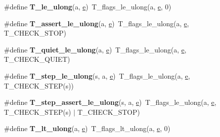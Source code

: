 \begin{DoxyCompactItemize}
\#define {\bfseries T\+\_\+le\+\_\+ulong}(a,  \mbox{\hyperlink{sun4u_2tte_8h_a8b0b9ed08e0e18920ec2682f48228c27}{e}})~T\+\_\+flags\+\_\+le\+\_\+ulong(a, \mbox{\hyperlink{sun4u_2tte_8h_a8b0b9ed08e0e18920ec2682f48228c27}{e}}, 0)
\item 
\mbox{\label{group__RTEMSTestFrameworkChecksULong_gac7131fa241a22a56e1d02a7219a679b1}} 
\#define {\bfseries T\+\_\+assert\+\_\+le\+\_\+ulong}(a,  \mbox{\hyperlink{sun4u_2tte_8h_a8b0b9ed08e0e18920ec2682f48228c27}{e}})~T\+\_\+flags\+\_\+le\+\_\+ulong(a, \mbox{\hyperlink{sun4u_2tte_8h_a8b0b9ed08e0e18920ec2682f48228c27}{e}}, T\+\_\+\+C\+H\+E\+C\+K\+\_\+\+S\+T\+OP)
\item 
\mbox{\label{group__RTEMSTestFrameworkChecksULong_gaafa15063182050760310b0ffdb9fe550}} 
\#define {\bfseries T\+\_\+quiet\+\_\+le\+\_\+ulong}(a,  \mbox{\hyperlink{sun4u_2tte_8h_a8b0b9ed08e0e18920ec2682f48228c27}{e}})~T\+\_\+flags\+\_\+le\+\_\+ulong(a, \mbox{\hyperlink{sun4u_2tte_8h_a8b0b9ed08e0e18920ec2682f48228c27}{e}}, T\+\_\+\+C\+H\+E\+C\+K\+\_\+\+Q\+U\+I\+ET)
\item 
\mbox{\label{group__RTEMSTestFrameworkChecksULong_gaa4810022c511818698647ec64d33e3f0}} 
\#define {\bfseries T\+\_\+step\+\_\+le\+\_\+ulong}(s,  a,  \mbox{\hyperlink{sun4u_2tte_8h_a8b0b9ed08e0e18920ec2682f48228c27}{e}})~T\+\_\+flags\+\_\+le\+\_\+ulong(a, \mbox{\hyperlink{sun4u_2tte_8h_a8b0b9ed08e0e18920ec2682f48228c27}{e}}, T\+\_\+\+C\+H\+E\+C\+K\+\_\+\+S\+T\+EP(s))
\item 
\mbox{\label{group__RTEMSTestFrameworkChecksULong_gabe7f974397105fc7f6e67176c7bf9d34}} 
\#define {\bfseries T\+\_\+step\+\_\+assert\+\_\+le\+\_\+ulong}(s,  a,  \mbox{\hyperlink{sun4u_2tte_8h_a8b0b9ed08e0e18920ec2682f48228c27}{e}})~T\+\_\+flags\+\_\+le\+\_\+ulong(a, \mbox{\hyperlink{sun4u_2tte_8h_a8b0b9ed08e0e18920ec2682f48228c27}{e}}, T\+\_\+\+C\+H\+E\+C\+K\+\_\+\+S\+T\+EP(s) $\vert$ T\+\_\+\+C\+H\+E\+C\+K\+\_\+\+S\+T\+OP)
\item 
\mbox{\label{group__RTEMSTestFrameworkChecksULong_gaebde6c07c83d18d607e873c0ed553744}} 
\#define {\bfseries T\+\_\+lt\+\_\+ulong}(a,  \mbox{\hyperlink{sun4u_2tte_8h_a8b0b9ed08e0e18920ec2682f48228c27}{e}})~T\+\_\+flags\+\_\+lt\+\_\+ulong(a, \mbox{\hyperlink{sun4u_2tte_8h_a8b0b9ed08e0e18920ec2682f48228c27}{e}}, 0)

\end{DoxyCompactItemize}
